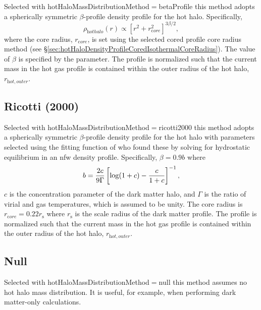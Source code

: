 Selected with {\normalfont \ttfamily hotHaloMassDistributionMethod}$=${\normalfont \ttfamily betaProfile} this method adopts a spherically symmetric $\beta$-profile density profile for the hot halo. Specifically,
\begin{equation}
 \rho_{\mathrm hot halo}(r) \propto \left[ r^2 + r_{\mathrm core}^2 \right]^{3\beta/2},
\end{equation}
where the core radius, $r_{\mathrm core}$, is set using the selected cored profile core radius method (see \S\ref{sec:hotHaloDensityProfileCoredIsothermalCoreRadius}). The value of $\beta$ is specified by the {\normalfont \ttfamily [hotHaloMassDistributionBeta]} parameter. The profile is normalized such that the current mass in the hot gas profile is contained within the outer radius of the hot halo, $r_{\mathrm hot, outer}$.

\subsection{Ricotti (2000)}\label{phys:hotHaloMassDistribution:hotHaloMassDistributionRicotti2000}

Selected with {\normalfont \ttfamily hotHaloMassDistributionMethod}$=${\normalfont \ttfamily ricotti2000} this method adopts a spherically symmetric $\beta$-profile density profile for the hot halo with parameters selected using the fitting function of \cite{ricotti_feedback_2000} who found these by solving for hydrostatic equilibrium in an \gls{nfw} density profile. Specifically, $\beta = 0.9 b$ where
\begin{equation}
 b = {2 c \over 9 \Gamma} \left[ \log(1+c) - {c\over 1+c}\right]^{-1},
\end{equation}
$c$ is the concentration parameter of the dark matter halo, and $\Gamma$ is the ratio of virial and gas temperatures, which is assumed to be unity. The core radius is $r_{\mathrm core} = 0.22 r_{\mathrm s}$ where $r_{\mathrm s}$ is the scale radius of the dark matter profile. The profile is normalized such that the current mass in the hot gas profile is contained within the outer radius of the hot halo, $r_{\mathrm hot, outer}$.

\subsection{Null}\label{phys:hotHaloMassDistribution:hotHaloMassDistributionNull}

Selected with {\normalfont \ttfamily hotHaloMassDistributionMethod}$=${\normalfont \ttfamily null} this method assumes no hot halo mass distribution. It is useful, for example, when performing dark matter-only calculations.

